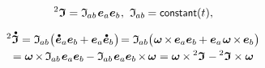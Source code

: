 \nopagebreak\vspace{-0.1em}\begin{equation*}
\inertiatensor = \inertiatensorcomponents{ab} \hspace{.1ex} \bm{e}_a \bm{e}_b
\hspace{.1ex} , \hspace{.8ex}
\inertiatensorcomponents{ab} \hspace{-0.2ex} = \constant(t)
\vspace{.1ex} ,
\end{equation*}

\vspace{-0.1em}\noindent
{}

\nopagebreak\vspace{-0.2em}\begin{multline*}
\inertiatensordotabove
= \inertiatensorcomponents{ab} \bigl( \hspace{.1ex}
\mathdotabove{\bm{e}}_a \bm{e}_b \hspace{-0.1ex}
+ \bm{e}_a \mathdotabove{\bm{e}}_b
\hspace{.1ex} \bigr) \hspace{-0.33ex}
= \inertiatensorcomponents{ab} \hspace{-0.1ex} \bigl( \hspace{.1ex}
\bm{\omega} \hspace{-0.2ex} \times \hspace{-0.2ex} \bm{e}_a \bm{e}_b \hspace{-0.1ex}
+ \bm{e}_a \hspace{.2ex} \bm{\omega} \hspace{-0.2ex} \times \hspace{-0.2ex} \bm{e}_b
\hspace{.1ex} \bigr)
\\[-0.1em]
%
= \bm{\omega} \hspace{-0.2ex} \times \hspace{-0.2ex} \inertiatensorcomponents{ab} \hspace{.1ex} \bm{e}_a \bm{e}_b \hspace{-0.1ex}
- \inertiatensorcomponents{ab} \hspace{.1ex} \bm{e}_a \bm{e}_b \hspace{-0.2ex} \times \hspace{-0.2ex} \bm{\omega}
= \bm{\omega} \hspace{-0.1ex} \times \inertiatensor \hspace{.1ex}
- \inertiatensor \times \bm{\omega}
\end{multline*}

